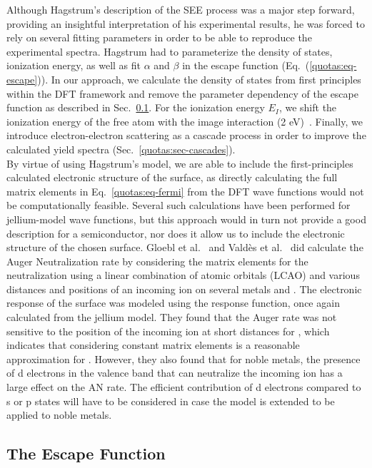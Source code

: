 \begin{refsection}
Although Hagstrum's description of the SEE process was a major step forward, providing an insightful interpretation of his experimental results, he was forced to rely on several fitting parameters in order to be able to reproduce the experimental spectra. Hagstrum had to parameterize the density of states, ionization energy, as well as fit $\alpha$ and $\beta$ in the escape function (Eq.~(\ref{quotas:eq-escape})). In our approach, we calculate the density of states from first principles within the DFT framework and remove the parameter dependency of the escape function as described in Sec.~\ref{quotas:sec-escape}. For the ionization energy $E_I$, we shift the ionization energy of the free atom with the image interaction (2 \si{\electronvolt})~\cite{Baragiola1996, Riccardi2003}. Finally, we introduce electron-electron scattering as a cascade process in order to improve the calculated yield spectra (Sec.~\ref{quotas:sec-cascades}).\\

By virtue of using Hagstrum's model, we are able to include the first-principles calculated electronic structure of the surface, as directly calculating the full matrix elements in Eq.~\ref{quotas:eq-fermi} from the DFT wave functions would not be computationally feasible. Several such calculations have been performed for jellium-model wave functions, but this approach would in turn not provide a good description for a semiconductor, nor does it allow us to include the electronic structure of the chosen surface. Gloebl et al.~\cite{Goebl2011, Goebl2013} and Vald\`es et al.~\cite{Valdes2006} did calculate the Auger Neutralization rate by considering the matrix elements for the neutralization using a linear combination of atomic orbitals (LCAO) and various distances and positions of an incoming  ion on several metals and . The electronic response of the surface was modeled using the response function, once again calculated from the jellium model. They found that the Auger rate was not sensitive to the position of the incoming ion at short distances for , which indicates that considering constant matrix elements is a reasonable approximation for . However, they also found that for noble metals, the presence of d electrons in the valence band that can neutralize the incoming ion has a large effect on the AN rate. The efficient contribution of d electrons compared to s or p states will have to be considered in case the model is extended to be applied to noble metals.

\subsection{The Escape Function} \label{quotas:sec-escape}


\end{refsection}
